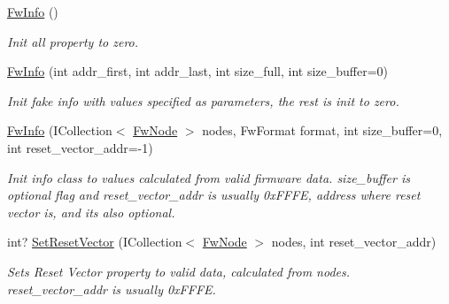 \begin{DoxyCompactItemize}
\item 
\mbox{\hyperlink{class_b_s_l430___n_e_t_1_1_firmware_tools_1_1_fw_tools_1_1_fw_info_a9df8f08dbbc374727b6c1cdf2db0117a}{Fw\+Info}} ()
\begin{DoxyCompactList}\small\item\em Init all property to zero. \end{DoxyCompactList}\item 
\mbox{\hyperlink{class_b_s_l430___n_e_t_1_1_firmware_tools_1_1_fw_tools_1_1_fw_info_ac7099273e3b2762b51535ccaad4f3c2a}{Fw\+Info}} (int addr\+\_\+first, int addr\+\_\+last, int size\+\_\+full, int size\+\_\+buffer=0)
\begin{DoxyCompactList}\small\item\em Init fake info with values specified as parameters, the rest is init to zero. \end{DoxyCompactList}\item 
\mbox{\hyperlink{class_b_s_l430___n_e_t_1_1_firmware_tools_1_1_fw_tools_1_1_fw_info_a0b3ab5316467374d612de29567b89769}{Fw\+Info}} (I\+Collection$<$ \mbox{\hyperlink{class_b_s_l430___n_e_t_1_1_firmware_tools_1_1_fw_tools_1_1_fw_node}{Fw\+Node}} $>$ nodes, Fw\+Format format, int size\+\_\+buffer=0, int reset\+\_\+vector\+\_\+addr=-\/1)
\begin{DoxyCompactList}\small\item\em Init info class to values calculated from valid firmware data. size\+\_\+buffer is optional flag and reset\+\_\+vector\+\_\+addr is usually 0x\+F\+F\+FE, address where reset vector is, and its also optional. \end{DoxyCompactList}\item 
int? \mbox{\hyperlink{class_b_s_l430___n_e_t_1_1_firmware_tools_1_1_fw_tools_1_1_fw_info_a29c67167406735189b1f2d009dd0f3a8}{Set\+Reset\+Vector}} (I\+Collection$<$ \mbox{\hyperlink{class_b_s_l430___n_e_t_1_1_firmware_tools_1_1_fw_tools_1_1_fw_node}{Fw\+Node}} $>$ nodes, int reset\+\_\+vector\+\_\+addr)
\begin{DoxyCompactList}\small\item\em Sets Reset Vector property to valid data, calculated from nodes. reset\+\_\+vector\+\_\+addr is usually 0x\+F\+F\+FE. \end{DoxyCompactList}\end{DoxyCompactItemize}

